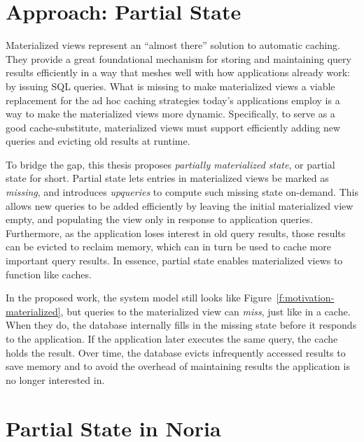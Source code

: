 \section{Approach: Partial State}
\label{s:approach}

Materialized views represent an ``almost there'' solution to automatic caching.
They provide a great foundational mechanism for storing and maintaining query
results efficiently in a way that meshes well with how applications already
work: by issuing SQL queries. What is missing to make materialized views a
viable replacement for the ad hoc caching strategies today's applications employ
is a way to make the materialized views more dynamic. Specifically, to serve as
a good cache-substitute, materialized views must support efficiently adding new
queries and evicting old results at runtime.

To bridge the gap, this thesis proposes \textit{partially materialized state},
or partial state for short. Partial state lets entries in materialized views be
marked as \textit{missing}, and introduces \textit{upqueries} to compute such
missing state on-demand. This allows new queries to be added efficiently by
leaving the initial materialized view empty, and populating the view only in
response to application queries. Furthermore, as the application loses interest
in old query results, those results can be evicted to reclaim memory, which can
in turn be used to cache more important query results. In essence, partial state
enables materialized views to function like caches.

In the proposed work, the system model still looks like
Figure~\vref{f:motivation-materialized}, but queries to the materialized view
can \emph{miss}, just like in a cache. When they do, the database internally
fills in the missing state before it responds to the application. If the
application later executes the same query, the cache holds the result. Over
time, the database evicts infrequently accessed results to save memory and to
avoid the overhead of maintaining results the application is no longer
interested in.

\section{Partial State in Noria}
\label{s:intro:noria}

